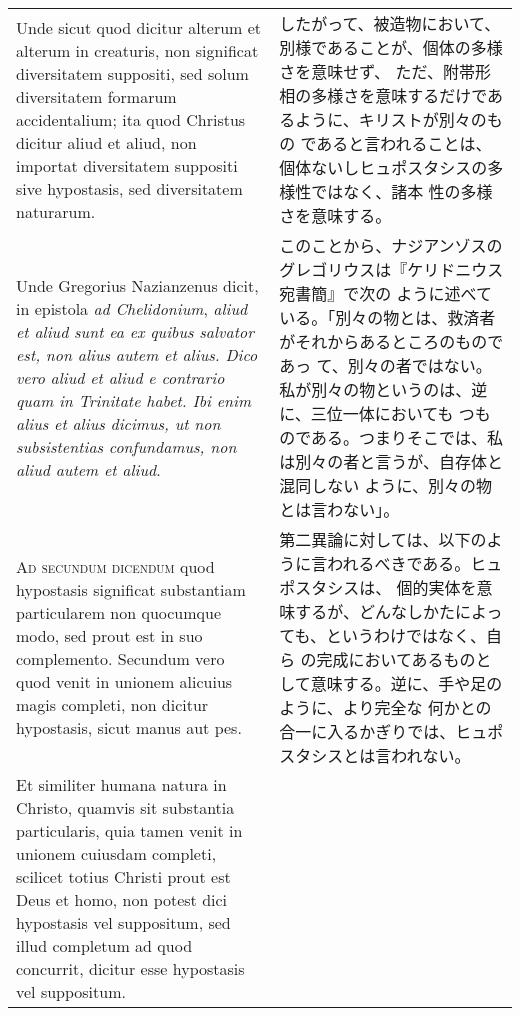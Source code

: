 \documentclass[10pt]{jsarticle} %
\begin{document}
\begin{longtable}{p{21em}p{21em}}
\\





Unde sicut quod dicitur alterum et alterum in creaturis, non
significat diversitatem suppositi, sed solum diversitatem formarum
accidentalium; ita quod Christus dicitur aliud et aliud, non importat
diversitatem suppositi sive hypostasis, sed diversitatem naturarum.

&

したがって、被造物において、別様であることが、個体の多様さを意味せず、
ただ、附帯形相の多様さを意味するだけであるように、キリストが別々のもの
であると言われることは、個体ないしヒュポスタシスの多様性ではなく、諸本
性の多様さを意味する。


\\


Unde Gregorius Nazianzenus dicit, in epistola {\itshape ad
Chelidonium}, {\itshape aliud et aliud sunt ea ex quibus salvator est,
non alius autem et alius. Dico vero aliud et aliud e contrario quam in
Trinitate habet. Ibi enim alius et alius dicimus, ut non subsistentias
confundamus, non aliud autem et aliud}.

&


このことから、ナジアンゾスのグレゴリウスは『ケリドニウス宛書簡』で次の
ように述べている。「別々の物とは、救済者がそれからあるところのものであっ
て、別々の者ではない。私が別々の物というのは、逆に、三位一体においても
つものである。つまりそこでは、私は別々の者と言うが、自存体と混同しない
ように、別々の物とは言わない」。

\\



{\scshape Ad secundum dicendum} quod hypostasis significat substantiam
particularem non quocumque modo, sed prout est in suo
complemento. Secundum vero quod venit in unionem alicuius magis
completi, non dicitur hypostasis, sicut manus aut pes.

&

第二異論に対しては、以下のように言われるべきである。ヒュポスタシスは、
個的実体を意味するが、どんなしかたによっても、というわけではなく、自ら
の完成においてあるものとして意味する。逆に、手や足のように、より完全な
何かとの合一に入るかぎりでは、ヒュポスタシスとは言われない。


\\

Et similiter humana natura in Christo, quamvis sit substantia
particularis, quia tamen venit in unionem cuiusdam completi, scilicet
totius Christi prout est Deus et homo, non potest dici hypostasis vel
suppositum, sed illud completum ad quod concurrit, dicitur esse
hypostasis vel suppositum.


\end{longtable}
\end{document}
